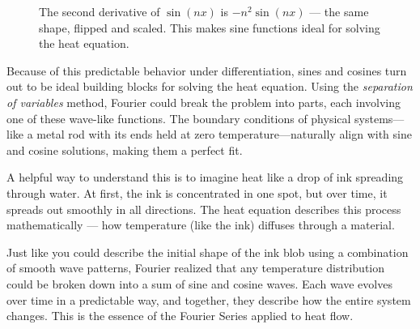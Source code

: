 \begin{figure}[H]
\centering
{}
\caption{The second derivative of $\sin(nx)$ is $-n^2 \sin(nx)$ — the same shape, flipped and scaled. This makes sine functions ideal for solving the heat equation.}
\end{figure}



Because of this predictable behavior under differentiation, sines and cosines turn out to be ideal building blocks for solving the heat equation. Using the \textit{separation of variables} method, Fourier could break the problem into parts, each involving one of these wave-like functions. The boundary conditions of physical systems—like a metal rod with its ends held at zero temperature—naturally align with sine and cosine solutions, making them a perfect fit.

A helpful way to understand this is to imagine heat like a drop of ink spreading through water. At first, the ink is concentrated in one spot, but over time, it spreads out smoothly in all directions. The heat equation describes this process mathematically — how temperature (like the ink) diffuses through a material.


Just like you could describe the initial shape of the ink blob using a combination of smooth wave patterns, Fourier realized that any temperature distribution could be broken down into a sum of sine and cosine waves. Each wave evolves over time in a predictable way, and together, they describe how the entire system changes. This is the essence of the Fourier Series applied to heat flow.

